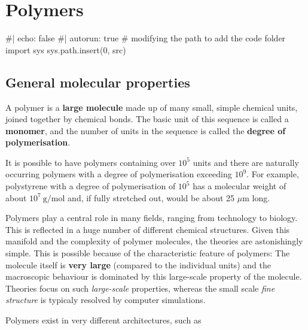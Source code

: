 \documentclass[
  letterpaper,
  enabledeprecatedfontcommands]{report}
\newenvironment{Shaded}{\begin{snugshade}}{\end{snugshade}}
\newcommand{\NormalTok}[1]{\textcolor[rgb]{0.00,0.23,0.31}{#1}}
\begin{document}

\chapter{Polymers}\label{polymers}

\begin{Shaded}
\begin{Highlighting}[]
\NormalTok{\#| echo: false}
\NormalTok{\#| autorun: true}
\NormalTok{\# modifying the path to add the code folder}
\NormalTok{import sys}
\NormalTok{sys.path.insert(0, \textquotesingle{}src\textquotesingle{})}
\end{Highlighting}
\end{Shaded}

\section{General molecular
properties}\label{general-molecular-properties}

A polymer is a \textbf{large molecule} made up of many small, simple
chemical units, joined together by chemical bonds. The basic unit of
this sequence is called a \textbf{monomer}, and the number of units in
the sequence is called the \textbf{degree of polymerisation}.

It is possible to have polymers containing over \(10^{5}\) units and
there are naturally occurring polymers with a degree of polymerisation
exceeding \(10^{9}\). For example, polystyrene with a degree of
polymerisation of \(10^{5}\) has a molecular weight of about
\(10^{7} \mathrm{~g} / \mathrm{mol}\) and, if fully stretched out, would
be about 25 \(\mu \mathrm{m}\) long.

Polymers play a central role in many fields, ranging from technology to
biology. This is reflected in a huge number of different chemical
structures. Given this manifold and the complexity of polymer molecules,
the theories are astonishingly simple. This is possible because of the
characteristic feature of polymers: The molecule itself is \textbf{very
large} (compared to the individual units) and the macroscopic behaviour
is dominated by this large-scale property of the molecule. Theories
focus on such \emph{large-scale} properties, whereas the small scale
\emph{fine structure} is typicaly resolved by computer simulations.

Polymers exist in very different architectures, such as
\end{document}
